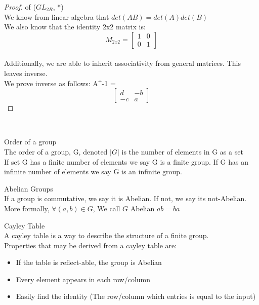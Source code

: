 \documentclass{article}
\theoremstyle{claim}
\begin{document}
\begin{proof} of  ($GL_{2R}$, *)\\
  We know from linear algebra that $det(AB) = det(A)det(B)$\\
  We also know that the identity 2x2 matrix is:
  \[
M_{2x2}=
  \begin{bmatrix}
    1 & 0  \\
    0 & 1
  \end{bmatrix}
\]\\
Additionally, we are able to inherit associativity from general matrices. 
This leaves inverse.\\
We prove inverse as follows:
A^{-1} =  
\[
    \begin{bmatrix}
      d & -b  \\
      -c & a
    \end{bmatrix}
\]
\end{proof}\\

\begin{definition}{Order of a  group}\\
The order of a group, G, denoted $| G |$ is the number of elements in G as a set\\
If set G has a finite number of elements we say G is a finite group. If G has an infinite number of elements we say G is an infinite group.
\end{definition}

\begin{definition}{Abelian Groups}\\
If a group is commutative, we say it is Abelian. If not, we say its not-Abelian. More formally, $\forall (a, b) \in G$, We call $G$ Abelian \iff $ab = ba$
\end{definition}

\begin{definition}{Cayley Table}\\
A cayley table is a way to describe the structure of a finite group.\\
Properties that may be derived from a cayley table are:
\begin{itemize}
  \item If the table is reflect-able, the group is Abelian 
  \item Every element appears in each row/column
  \item Easily find the identity (The row/column which entries is equal to the input)
\end{itemize}
\end{definition}
\end{document}
